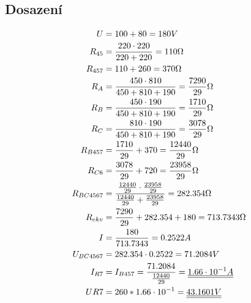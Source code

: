 \subsection{Dosazení}
\begin{figure}[H]

  \begin{equation*}
    \begin{aligned}
      U          & = 100 + 80 = 180V                                                                                    \\
      R_{45}     & = \frac{220 \cdot 220}{220 + 220} = 110 \ohm                                                         \\
      R_{457}    & = 110 + 260 = 370 \ohm                                                                               \\
      R_A        & = \frac{450 \cdot 810}{450 + 810 + 190} = \frac{7290}{29} \ohm                                       \\
      R_B        & = \frac{450 \cdot 190}{450 + 810 + 190} = \frac{1710}{29} \ohm                                       \\
      R_C        & = \frac{810 \cdot 190}{450 + 810 + 190} = \frac{3078}{29} \ohm                                       \\
      R_{B457}   & = \frac{1710}{29} + 370 = \frac{12440}{29} \ohm                                                      \\
      R_{C6}     & = \frac{3078}{29} + 720 = \frac{23958}{29} \ohm                                                      \\
      R_{BC4567} & = \frac{\frac{12440}{29} \cdot \frac{23958}{29}}{\frac{12440}{29} + \frac{23958}{29}} = 282.354 \ohm \\
      R_{ekv}    & = \frac{7290}{29} + 282.354 + 180 = 713.7343 \ohm                                                    \\
      I          & = \frac{180}{713.7343} = 0.2522 A                                                                    \\
      U_{BC4567} & = 282.354 \cdot 0.2522 = 71.2084 V                                                                   \\
      I_{R7}     & = I_{B457} = \frac{71.2084}{\frac{12440}{29}} = \underline{\underline{1.66 \cdot 10^{-1} A}}         \\
      UR7        & = 260 * 1.66 \cdot 10^{-1} = \underline{\underline{43.1601 V}}
    \end{aligned}
  \end{equation*}
\end{figure}
